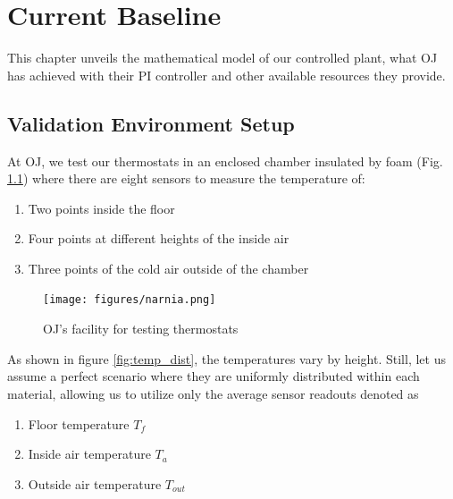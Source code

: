 \documentclass[../main.tex]{subfiles}
\begin{document}
\chapter{Current Baseline} \label{chap:baseline}
This chapter unveils the mathematical model of our controlled plant, what OJ has achieved with their PI controller and other available resources they provide.

\section{Validation Environment Setup} \label{sec:env_intro}
At OJ, we test our thermostats in an enclosed chamber insulated by foam (Fig. \ref{fig:narnia}) where there are eight sensors to measure the temperature of:
\begin{enumerate}
    \item Two points inside the floor
    \item Four points at different heights of the inside air
    \item Three points of the cold air outside of the chamber
\end{enumerate}
\begin{figure}[htbp]
    \centering
    \texttt{[image: figures/narnia.png]}
    \caption{OJ's facility for testing thermostats}
    \label{fig:narnia}
\end{figure}
As shown in figure \ref{fig:temp_dist}, the temperatures vary by height. Still, let us assume a perfect scenario where they are uniformly distributed within each material, allowing us to utilize only the average sensor readouts denoted as
\begin{enumerate}
    \item Floor temperature $T_f$
    \item Inside air temperature $T_a$
    \item Outside air temperature $T_{out}$
\end{enumerate}
\end{document}
